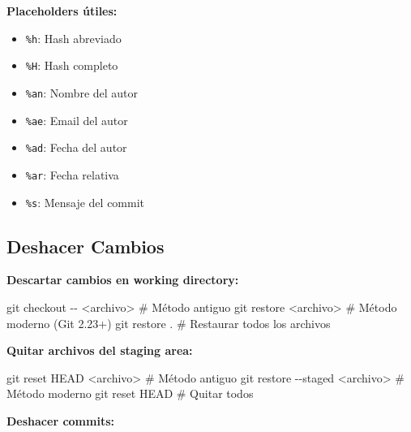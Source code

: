 \documentclass[
  doc,
  floatsintext,
  longtable,
  a4paper,
  nolmodern,
  notxfonts,
  notimes,
  12pt,
  colorlinks=true,linkcolor=blue,citecolor=blue,urlcolor=blue]{apa7}
\newenvironment{Shaded}{\begin{snugshade}}{\end{snugshade}}
\newcommand{\AttributeTok}[1]{\textcolor[rgb]{0.40,0.45,0.13}{#1}}
\newcommand{\CommentTok}[1]{\textcolor[rgb]{0.37,0.37,0.37}{#1}}
\newcommand{\FunctionTok}[1]{\textcolor[rgb]{0.28,0.35,0.67}{#1}}
\newcommand{\NormalTok}[1]{\textcolor[rgb]{0.00,0.23,0.31}{#1}}
\newcommand{\OperatorTok}[1]{\textcolor[rgb]{0.37,0.37,0.37}{#1}}
\providecommand{\tightlist}{%
  \setlength{\itemsep}{0pt}\setlength{\parskip}{0pt}}
\begin{document}
\textbf{Placeholders útiles:}

\begin{itemize}
\tightlist
\item
  \texttt{\%h}: Hash abreviado
\item
  \texttt{\%H}: Hash completo
\item
  \texttt{\%an}: Nombre del autor
\item
  \texttt{\%ae}: Email del autor
\item
  \texttt{\%ad}: Fecha del autor
\item
  \texttt{\%ar}: Fecha relativa
\item
  \texttt{\%s}: Mensaje del commit
\end{itemize}

\subsection{Deshacer Cambios}\label{deshacer-cambios}

\textbf{Descartar cambios en working directory:}

\begin{Shaded}
\begin{Highlighting}[]
\FunctionTok{git}\NormalTok{ checkout }\AttributeTok{{-}{-}} \OperatorTok{\textless{}}\NormalTok{archivo}\OperatorTok{\textgreater{}}  \CommentTok{\# Método antiguo}
\FunctionTok{git}\NormalTok{ restore }\OperatorTok{\textless{}}\NormalTok{archivo}\OperatorTok{\textgreater{}}      \CommentTok{\# Método moderno (Git 2.23+)}
\FunctionTok{git}\NormalTok{ restore .              }\CommentTok{\# Restaurar todos los archivos}
\end{Highlighting}
\end{Shaded}

\textbf{Quitar archivos del staging area:}

\begin{Shaded}
\begin{Highlighting}[]
\FunctionTok{git}\NormalTok{ reset HEAD }\OperatorTok{\textless{}}\NormalTok{archivo}\OperatorTok{\textgreater{}}   \CommentTok{\# Método antiguo}
\FunctionTok{git}\NormalTok{ restore }\AttributeTok{{-}{-}staged} \OperatorTok{\textless{}}\NormalTok{archivo}\OperatorTok{\textgreater{}}  \CommentTok{\# Método moderno}
\FunctionTok{git}\NormalTok{ reset HEAD             }\CommentTok{\# Quitar todos}
\end{Highlighting}
\end{Shaded}

\textbf{Deshacer commits:}
\end{document}

